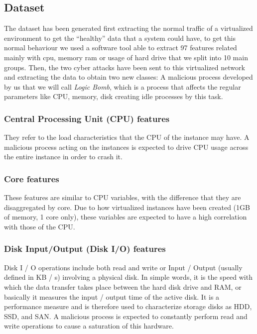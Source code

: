 \documentclass{iosart2c}
\begin{document}
\subsection{Dataset}\label{dataset_autoencoder}

The dataset has been generated first extracting the normal traffic of a virtualized environment to get the ``healthy'' data that a system could have, to get this normal behaviour we used a software tool able to extract 97 features related mainly with cpu, memory ram or usage of hard drive that we split into 10 main groups. Then, the two cyber attacks have been sent to this virtualized network and extracting the data to obtain two new classes: A malicious process developed by us that we will call \textit{Logic Bomb}, which is a process that affects the regular parameters like CPU, memory, disk creating idle processes by this task.

\subsubsection{Central Processing Unit (CPU) features}
They refer to the load characteristics that the CPU of the instance may have. A malicious process acting on the instances is expected to drive CPU usage across the entire instance in order to crash it.\\


\subsubsection{Core features}

These features are similar to CPU variables, with the difference that they are disaggregated by core. Due to how virtualized instances have been created (1GB of memory, 1 core only), these variables are expected to have a high correlation with those of the CPU.


\subsubsection{Disk Input/Output (Disk I/O) features}

Disk I / O operations include both read and write or Input / Output (usually defined in KB / s) involving a physical disk. In simple words, it is the speed with which the data transfer takes place between the hard disk drive and RAM, or basically it measures the input / output time of the active disk. It is a performance measure and is therefore used to characterize storage disks as HDD, SSD, and SAN. A malicious process is expected to constantly perform read and write operations to cause a saturation of this hardware. \\
\end{document}
